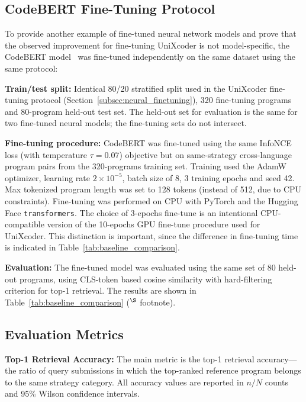 \subsection{CodeBERT Fine-Tuning Protocol}
\label{subsec:codebert_finetuning}

To provide another example of fine-tuned neural network models and prove that the observed improvement for fine-tuning UniXcoder is not model-specific, the CodeBERT model~\cite{ref_codebert} was fine-tuned independently on the same dataset using the same protocol:

\textbf{Train/test split:} Identical 80/20 stratified split used in the UniXcoder fine-tuning protocol (Section~\ref{subsec:neural_finetuning}), 320 fine-tuning programs and 80-program held-out test set. The held-out set for evaluation is the same for two fine-tuned neural models; the fine-tuning sets do not intersect.

\textbf{Fine-tuning procedure:} CodeBERT was fine-tuned using the same InfoNCE loss (with temperature $\tau=0.07$) objective but on same-strategy cross-language program pairs from the 320-programs training set. Training used the AdamW optimizer, learning rate $2\times10^{-5}$, batch size of 8, 3 training epochs and seed 42. Max tokenized program length was set to 128 tokens (instead of 512, due to CPU constraints). Fine-tuning was performed on CPU with PyTorch and the Hugging Face \texttt{transformers}. The choice of 3-epochs fine-tune is an intentional CPU-compatible version of the 10-epochs GPU fine-tune procedure used for UniXcoder. This distinction is important, since the difference in fine-tuning time is indicated in Table~\ref{tab:baseline_comparison}. 

\textbf{Evaluation:} The fine-tuned model was evaluated using the same set of 80 held-out programs, using CLS-token based cosine similarity with hard-filtering criterion for top-1 retrieval. The results are shown in Table~\ref{tab:baseline_comparison} ($^{\S}$ footnote).



\subsection{Evaluation Metrics}
\label{subsec:metrics}

\textbf{Top-1 Retrieval Accuracy:} The main metric is the top-1 retrieval accuracy---the ratio of query submissions in which the top-ranked reference program belongs to the same strategy category. All accuracy values are reported in $n/N$ counts and 95\% Wilson confidence intervals.

